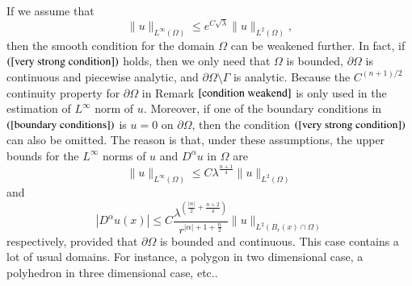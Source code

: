\documentclass[a4paper, 12pt, onecolumn]{article} \textwidth 148mm
\begin{document}
\begin{remark}
If we assume that
\begin{equation}\label{very strong condition}
\|u\|_{L^{\infty}(\Omega)}\leq e^{C\sqrt{\lambda}}\|u\|_{L^2(\Omega)},
\end{equation}
then the smooth condition for the domain $\Omega$ can be weakened further. In fact, if $(\ref{very strong condition})$ holds, then we only need that $\Omega$ is bounded, $\partial\Omega$ is continuous and piecewise  analytic, and $\partial\Omega\setminus\Gamma$ is analytic. Because the $C^{(n+1)/2}$ continuity property for $\partial\Omega$ in Remark $\ref{condition weakend}$ is only used in the estimation of $L^{\infty}$ norm of $u$.
Moreover, if one of the boundary conditions in $(\ref{boundary conditions})$ is $u=0$ on $\partial\Omega$, then the condition $(\ref{very strong condition})$ can also be omitted.
The reason is that, under these assumptions, the upper bounds for the $L^{\infty}$ norms of $u$ and $D^{\alpha}u$ in $\Omega$ are
\begin{equation*}
\|u\|_{L^{\infty}(\Omega)}\leq C\lambda^{\frac{n+1}{4}}\|u\|_{L^2(\Omega)}
\end{equation*}
and
\begin{equation*}
|D^{\alpha}u(x)|\leq C\frac{\lambda^{(\frac{|\alpha|}{2}+\frac{n+2}{4})}}
{r^{|\alpha|+1+\frac{n}{2}}}\|u\|_{L^2(B_{r}(x)\cap\Omega)}
\end{equation*}
respectively, provided that $\partial\Omega$ is bounded and continuous.
This case contains a lot of usual domains. For instance, a polygon in two dimensional case, a polyhedron in three dimensional case, etc..
\end{remark}


\newpage


\end{document}
